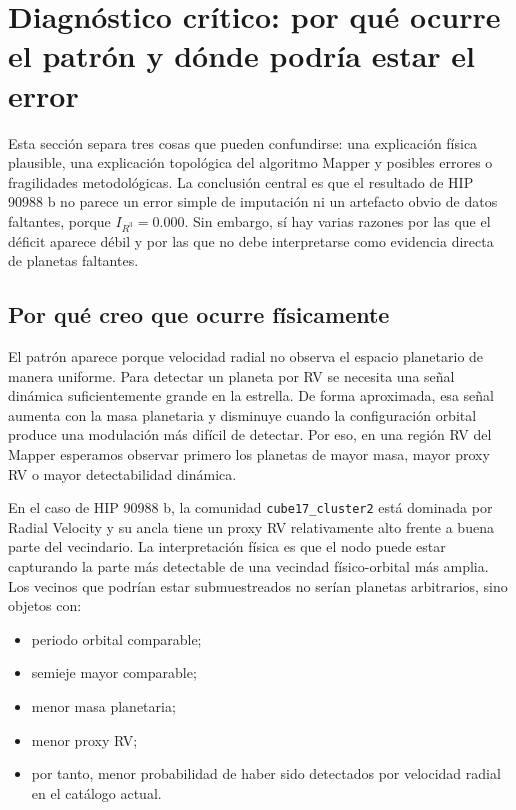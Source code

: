 \documentclass[11pt]{article}
\begin{document}
\section{Diagnóstico crítico: por qué ocurre el patrón y dónde podría estar el error}

Esta sección separa tres cosas que pueden confundirse: una explicación física plausible, una explicación topológica del algoritmo Mapper y posibles errores o fragilidades metodológicas. La conclusión central es que el resultado de HIP 90988 b no parece un error simple de imputación ni un artefacto obvio de datos faltantes, porque $I_{R^3}=0.000$. Sin embargo, sí hay varias razones por las que el déficit aparece débil y por las que no debe interpretarse como evidencia directa de planetas faltantes.

\subsection{Por qué creo que ocurre físicamente}

El patrón aparece porque velocidad radial no observa el espacio planetario de manera uniforme. Para detectar un planeta por RV se necesita una señal dinámica suficientemente grande en la estrella. De forma aproximada, esa señal aumenta con la masa planetaria y disminuye cuando la configuración orbital produce una modulación más difícil de detectar. Por eso, en una región RV del Mapper esperamos observar primero los planetas de mayor masa, mayor proxy RV o mayor detectabilidad dinámica.

En el caso de HIP 90988 b, la comunidad \texttt{cube17\_cluster2} está dominada por Radial Velocity y su ancla tiene un proxy RV relativamente alto frente a buena parte del vecindario. La interpretación física es que el nodo puede estar capturando la parte más detectable de una vecindad físico-orbital más amplia. Los vecinos que podrían estar submuestreados no serían planetas arbitrarios, sino objetos con:

\begin{itemize}
    \item periodo orbital comparable;
    \item semieje mayor comparable;
    \item menor masa planetaria;
    \item menor proxy RV;
    \item por tanto, menor probabilidad de haber sido detectados por velocidad radial en el catálogo actual.
\end{itemize}
\end{document}
